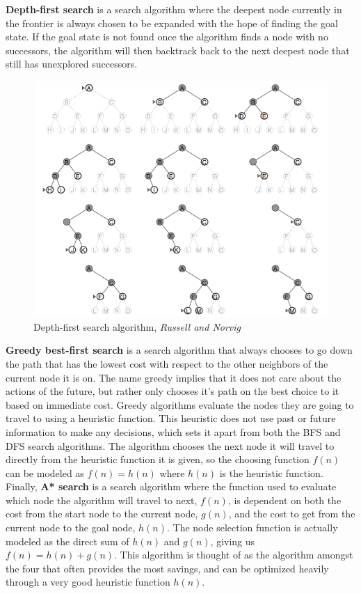 \documentclass[titlepage]{article}
\begin{document}
\noindent
\textbf{Depth-first search} is a search algorithm where the deepest node currently in the frontier is always chosen to be expanded with the hope of finding the goal state. If the goal state is not found once the algorithm finds a node with no successors, the algorithm will then backtrack back to the next deepest node that still has unexplored successors.

\newpage

\begin{figure}[h!]
\includegraphics[width=\linewidth]{dfs.png}
\caption{Depth-first search algorithm, \textit{Russell and Norvig}}
\label{fig:DFSdiagram1}
\end{figure}

\noindent
\textbf{Greedy best-first search} is a search algorithm that always chooses to go down the path that has the lowest cost with respect to the other neighbors of the current node it is on. The name greedy implies that it does not care about the actions of the future, but rather only chooses it's path on the best choice to it based on immediate cost. Greedy algorithms evaluate the nodes they are going to travel to using a heuristic function. This heuristic does not use past or future information to make any decisions, which sets it apart from both the BFS and DFS search algorithms. The algorithm chooses the next node it will travel to directly from the heuristic function it is given, so the choosing function \(f(n)\) can be modeled as \(f(n) = h(n)\) where \(h(n)\) is the heuristic function.\newline
\newline
Finally, \textbf{A* search} is a search algorithm where the function used to evaluate which node the algorithm will travel to next, \(f(n)\), is dependent on both the cost from the start node to the current node, \(g(n)\), and the cost to get from the current node to the goal node, \(h(n)\). The node selection function is actually modeled as the direct sum of \(h(n)\) and \(g(n)\), giving us \(f(n) = h(n) + g(n)\). This algorithm is thought of as the algorithm amongst the four that often provides the most savings, and can be optimized heavily through a very good heuristic function \(h(n)\).
\end{document}
